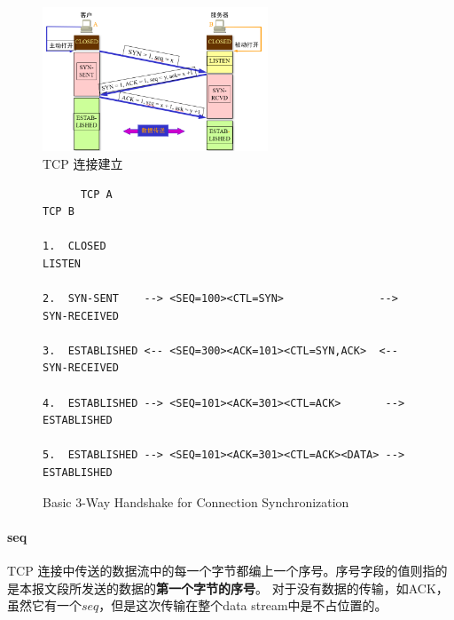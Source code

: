 \documentclass[a4paper]{report}
\begin{document}
\begin{figure}[H]
\centering
\includegraphics[width=0.6\textwidth]{tcp_est.png}
\caption{TCP 连接建立}
\end{figure}

\begin{figure}[H]
\centering
\begin{verbatim}
      TCP A                                                TCP B

1.  CLOSED                                               LISTEN

2.  SYN-SENT    --> <SEQ=100><CTL=SYN>               --> SYN-RECEIVED

3.  ESTABLISHED <-- <SEQ=300><ACK=101><CTL=SYN,ACK>  <-- SYN-RECEIVED

4.  ESTABLISHED --> <SEQ=101><ACK=301><CTL=ACK>       --> ESTABLISHED

5.  ESTABLISHED --> <SEQ=101><ACK=301><CTL=ACK><DATA> --> ESTABLISHED
\end{verbatim}
\caption{Basic 3-Way Handshake for Connection Synchronization}
\end{figure}

\paragraph{seq}TCP 连接中传送的数据流中的每一个字节都编上一个序号。序号字段的值则指的是本报文段所发送的数据的\textbf{第一个字节的序号}。 对于没有数据的传输，如ACK，虽然它有一个$seq$，但是这次传输在整个data stream中是不占位置的。
\end{document}
